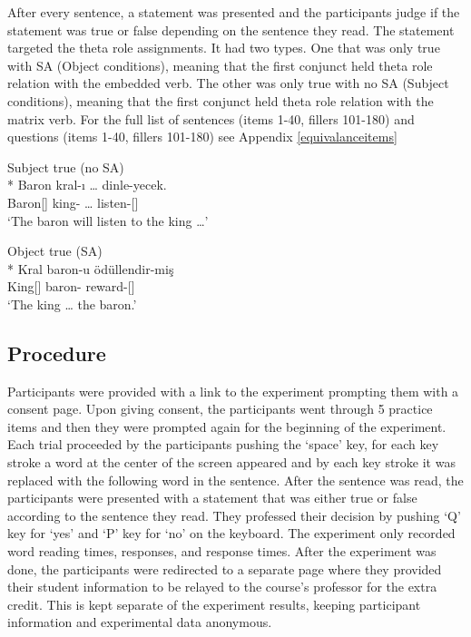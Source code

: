 After every sentence, a statement was presented and the participants judge if the statement was true or false depending on the sentence they read. The statement targeted the theta role assignments. It had two types. One that was only true with SA (Object conditions), meaning that the first conjunct held theta role relation with the embedded verb. The other was only true with no SA (Subject conditions), meaning that the first conjunct held theta role relation with the matrix verb. For the full list of sentences (items 1-40, fillers 101-180) and questions (items 1-40, fillers 101-180) see Appendix \ref{equivalanceitems}

\begin{exe}
\ex \label{exp3qtype}
\begin{xlist}
    \ex Subject true (no SA)\\* 
    \gll Baron kral-ı {\ldots} dinle-yecek. \\ 
    Baron[{\Nom}] king-{\Acc} {\ldots} listen-{\Fut}[{\Tsg}] \\
    \glt `The baron will listen to the king {\ldots}'

    \ex Object true (SA)\\* 
    \gll Kral baron-u ödüllendir-miş \\ 
    King[{\Nom}] baron-{\Acc} reward-{\Prf}[{\Tsg}] \\
    \glt `The king {\ldots} the baron.'
\end{xlist}
\end{exe}

\subsection{Procedure}

Participants were provided with a link to the experiment prompting them with a consent page. Upon giving consent, the participants went through 5 practice items and then they were prompted again for the beginning of the experiment. Each trial proceeded by the participants pushing the `space' key, for each key stroke a word at the center of the screen appeared and by each key stroke it was replaced with the following word in the sentence. After the sentence was read, the participants were presented with a statement that was either true or false according to the sentence they read. They professed their decision by pushing `Q' key for `yes' and `P' key for `no' on the keyboard. The experiment only recorded word reading times, responses, and response times. After the experiment was done, the participants were redirected to a separate page where they provided their student information to be relayed to the course's professor for the extra credit. This is kept separate of the experiment results, keeping participant information and experimental data anonymous.

